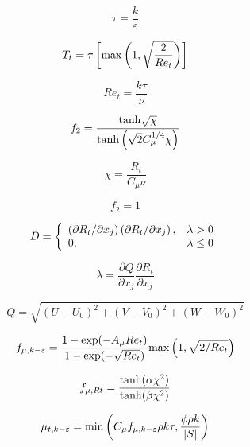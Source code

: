 \begin{equation}
\tau = \frac{k}{\varepsilon}
\end{equation}

\begin{equation}
T_t = \tau \left[ {\rm max} \left( 1, \sqrt{\frac{2}{Re_t}} \right) \right]
\end{equation}

\begin{equation}
Re_t = \frac{k \tau}{\nu}
\end{equation}

\begin{equation}
f_2 = \frac{{\rm tanh}\sqrt{\chi}}{{\rm tanh}\left(\sqrt{2} C_{\mu}^{1/4} \chi\right)}
\end{equation}

\begin{equation}
\chi = \frac{R_t}{C_{\mu} \nu}
\end{equation}

\begin{equation}
f_2 = 1
\end{equation}

\begin{equation}
  D = \left\{
  \begin{array}{l l}
  \left(\partial R_t / \partial x_j\right)
  \left(\partial R_t / \partial x_j\right), & \lambda>0 \\
  0, & \lambda \leq 0
  \end{array}\right.
\end{equation}

\begin{equation}
\lambda = \frac{\partial Q}{\partial x_j} \frac{\partial R_t}{\partial x_j}
\end{equation}

\begin{equation}
Q = \sqrt{(U-U_0)^2 + (V-V_0)^2 + (W-W_0)^2}
\end{equation}

\begin{equation}
f_{\mu,k-\varepsilon} = \frac{1-{\rm exp}(-A_{\mu}Re_t)}{1-{\rm exp}(-\sqrt{Re_t})}
{\rm max}\left( 1, \sqrt{2/Re_t} \right)
\end{equation}

\begin{equation}
f_{\mu,Rt} = \frac{{\rm tanh}(\alpha \chi^2)}
{{\rm tanh}(\beta \chi^2)}
\end{equation}

\begin{equation}
\mu_{t,k-\varepsilon} = {\rm min} \left( C_{\mu} f_{\mu,k-\varepsilon} \rho k \tau,
  \frac{\phi \rho k}{|S|} \right)
\end{equation}

